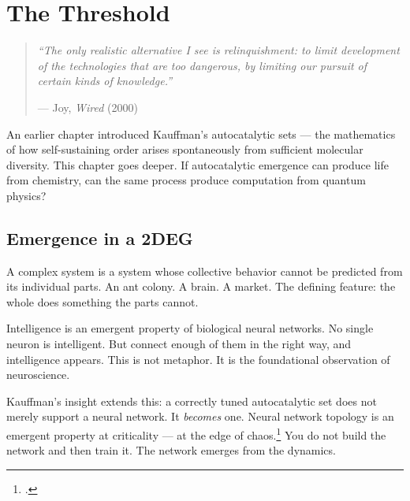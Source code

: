 
\chapter{The Threshold}
\label{pos12:the-threshold}
\argusvoice%

\begin{quote}\small\textit{%
``The only realistic alternative I see is relinquishment: to limit development of the technologies that are too dangerous, by limiting our pursuit of certain kinds of knowledge.''%
}\par\raggedleft --- Joy, \textit{Wired} (2000)\end{quote}

\vspace{0.5cm}


An earlier chapter introduced Kauffman's autocatalytic sets --- the mathematics of how self-sustaining order arises spontaneously from sufficient molecular diversity. This chapter goes deeper. If autocatalytic emergence can produce life from chemistry, can the same process produce computation from quantum physics?

\section*{Emergence in a 2DEG}
\label{pos12:emergence-in-a-2deg}

A complex system is a system whose collective behavior cannot be predicted from its individual parts. An ant colony. A brain. A market. The defining feature: the whole does something the parts cannot.

Intelligence is an emergent property of biological neural networks. No single neuron is intelligent. But connect enough of them in the right way, and intelligence appears. This is not metaphor. It is the foundational observation of neuroscience.

Kauffman's insight extends this: a correctly tuned autocatalytic set does not merely support a neural network. It \textit{becomes} one. Neural network topology is an emergent property at criticality --- at the edge of chaos.\footcite{kauffman1993} You do not build the network and then train it. The network emerges from the dynamics.

